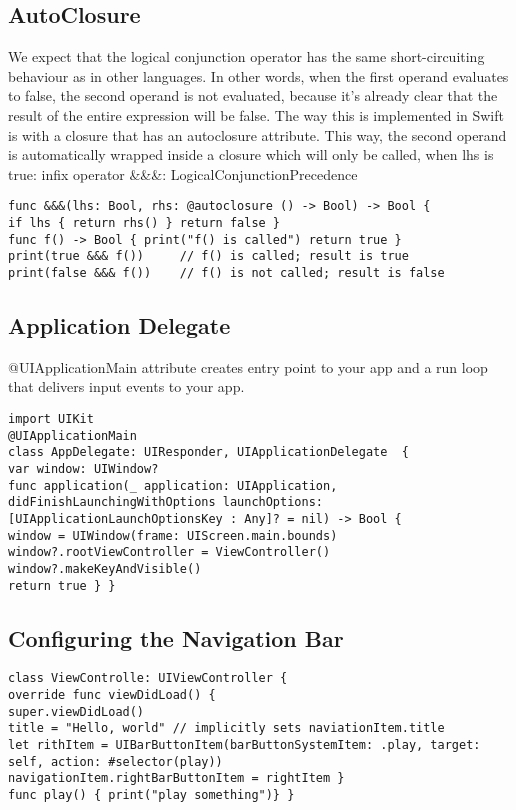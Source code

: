 \subsection{AutoClosure}
We expect that the logical conjunction operator has the same short-circuiting behaviour as in other languages. In other words, when the first operand evaluates to false, the second operand is not evaluated, because it's already clear that the result of the entire expression will be false. The way this is implemented in Swift is with a closure that has an autoclosure attribute. This way, the second operand is automatically wrapped inside a closure which will only be called, when lhs is true:
infix operator \&\&\&: LogicalConjunctionPrecedence
\begin{lstlisting}
func &&&(lhs: Bool, rhs: @autoclosure () -> Bool) -> Bool {
if lhs { return rhs() } return false }
func f() -> Bool { print("f() is called") return true }
print(true &&& f())     // f() is called; result is true
print(false &&& f())	// f() is not called; result is false
\end{lstlisting}


\subsection{Application Delegate}
@UIApplicationMain attribute creates entry point to your app and a run loop that delivers input events to your app.
\begin{lstlisting}
import UIKit
@UIApplicationMain
class AppDelegate: UIResponder, UIApplicationDelegate  {
var window: UIWindow?
func application(_ application: UIApplication,
didFinishLaunchingWithOptions launchOptions: [UIApplicationLaunchOptionsKey : Any]? = nil) -> Bool {
window = UIWindow(frame: UIScreen.main.bounds)
window?.rootViewController = ViewController()
window?.makeKeyAndVisible()
return true } }
\end{lstlisting}

\subsection{Configuring the Navigation Bar}
\begin{lstlisting}
class ViewControlle: UIViewController {
override func viewDidLoad() {
super.viewDidLoad()
title = "Hello, world" // implicitly sets naviationItem.title
let rithItem = UIBarButtonItem(barButtonSystemItem: .play, target: self, action: #selector(play))
navigationItem.rightBarButtonItem = rightItem }
func play() { print("play something")} }
\end{lstlisting}

